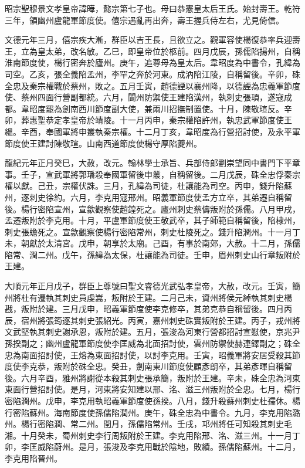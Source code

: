 
\begin{pinyinscope}

 昭宗聖穆景文孝皇帝諱曄，懿宗第七子也。母曰恭憲皇太后王氏。始封壽王。乾符三年，領幽州盧龍軍節度使。僖宗遇亂再出奔，壽王握兵侍左右，尤見倚信。



 文德元年三月，僖宗疾大漸，群臣以吉王長，且欲立之。觀軍容使楊復恭率兵迎壽王，立為皇太弟，改名敏。乙巳，即皇帝位於柩前。四月戊辰，孫儒陷揚州，自稱淮南節度使，楊行密奔於廬州。庚午，追尊母為皇太后。韋昭度為中書令，孔緯為司空。乙亥，張全義陷孟州，李罕之奔於河東。成汭陷江陵，自稱留後。辛卯，硃全忠及秦宗權戰於蔡州，敗之。五月壬寅，趙德諲以襄州降，以德諲為忠義軍節度使、蔡州四面行營副都統。六月，閬州防禦使王建陷漢州，執刺史張頊，遂寇成都。韋昭度罷為劍南西川節度副大使，兼兩川招撫制置使。十月，陳敬瑄反。辛卯，葬惠聖恭定孝皇帝於靖陵。十一月丙申，秦宗權陷許州，執忠武軍節度使王縕。辛酉，奉國軍將申叢執秦宗權。十二月丁亥，韋昭度為行營招討使，及永平軍節度使王建討陳敬瑄。山南西道節度使楊守厚陷夔州。



 龍紀元年正月癸巳，大赦，改元。翰林學士承旨、兵部侍郎劉崇望同中書門下平章事。壬子，宣武軍將郭璠殺奉國軍留後申叢，自稱留後。二月戊辰，硃全忠俘秦宗權以獻。己丑，宗權伏誅。三月，孔緯為司徒，杜讓能為司空。丙申，錢升陷蘇州，逐刺史徐約。六月，李克用寇邢州。昭義軍節度使孟方立卒，其弟遷自稱留後。楊行密陷宣州，宣歙觀察使趙鍠死之。廬州刺史蔡儔叛附於孫儒。八月甲戌，孟遷叛附於李克用。十月，平盧軍節度使王敬武卒，其子師範自稱留後，陷棣州，刺史張蟾死之。宣歙觀察使楊行密陷常州，刺史杜陵死之。錢升陷潤州。十一月丁未，朝獻於太清宮。戊申，朝享於太廟。己酉，有事於南郊，大赦。十二月，孫儒陷常、潤二州。戊午，孫緯為太保，杜讓能為司徒。壬申，眉州刺史山行章叛附於王建。



 大順元年正月戊子，群臣上尊號曰聖文睿德光武弘孝皇帝，大赦，改元。壬寅，簡州將杜有遷執其刺史員虔嵩，叛附於王建。二月己未，資州將侯元綽執其刺史楊戡，叛附於建。三月戊申，昭義軍節度使李克修卒，其弟克恭自稱留後。四月丙辰，宿州將張筠逐其刺史張紹光。丙寅，嘉州刺史硃實叛附於王建。丙子，戎州將文武堅執其刺史謝承恩，叛附於建。五月，張浚為河東行營都招討宣慰使，京兆尹孫揆副之；幽州盧龍軍節度使李匡威為北面招討使，雲州防禦使赫連鐸副之；硃全忠為南面招討使，王熔為東面招討使，以討李克用。壬寅，昭義軍將安居受殺其節度使李克恭，叛附於硃全忠。癸丑，劍南東川節度使顧彥朗卒，其弟彥暉自稱留後。六月辛酉，雅州將謝從本殺其刺史張承簡，叛附於王建。辛未，硃全忠為河東東面行營招討使。是月，河東將安知建以邢、洺、滋三州叛附於全忠。七月，楊行密陷潤州。戊申，李克用執昭義軍節度使孫揆。八月，錢升殺蘇州刺史杜孺休。楊行密陷蘇州。海南節度使孫儒陷潤州。庚午，硃全忠為中書令。九月，李克用陷潞州。楊行密陷潤、常二州。閏月，孫儒陷常州。壬戌，邛州將任可知殺其刺史毛湘。十月癸未，蜀州刺史李行周叛附於王建。李克用陷邢、洺、滋三州。十一月丁卯，李匡威陷蔚州。是月，張浚及李克用戰於陰地，敗績。孫儒陷蘇州。十二月，李克用陷晉州。




\end{pinyinscope}
